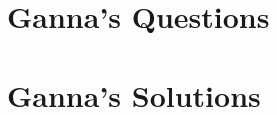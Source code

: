 \documentclass[a4paper,12pt]{book}
\begin{document}
\tableofcontents

\part{Ganna's Questions}




\part{Ganna's Solutions}



\end{document}
